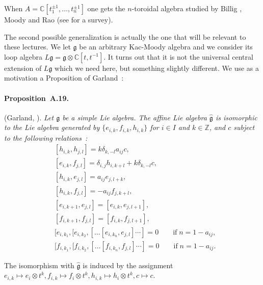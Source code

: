 \documentclass[a4paper,10pt]{amsart}
\def\Z{\mathbb{Z}}
\def\C{\mathbb{C}}
\def\g{\mathfrak{g}}
\numberwithin{equation}{section}
\begin{document}
{When $A=\C[t_1^{\pm 1}, \ldots, t_n^{\pm 1}]$ one gets the $n$-toroidal algebra studied by Billig \cite{Billig}, Moody \cite{MRY} and Rao \cite{Rao} (see \cite{Raosurvey} for a survey).

\vspace{.05in}

The second possible generalization is actually the one that will be relevant to these lectures. We let $\g$ be an arbitrary Kac-Moody algebra and we consider its loop algebra $L\g=\g \otimes \C[t,t^{-1}]$. It turns out that it is not the universal central extension of $L\g$ which we need here, but something slightly different. We use as a motivation a Proposition of Garland~:

\vspace{.1in}

\paragraph{\textbf{Proposition~A.19.}}(Garland, \cite{Garland}). \textit{Let $\g$ be a simple Lie algebra. The affine Lie algebra $\widehat{\g}$ is isomorphic to the Lie algebra generated by $\{e_{i,k},f_{i,k},h_{i,k}\}$ for $i \in I$ and $k \in \Z$, and $c$ subject to the following relations~:
\begin{equation}\label{E:defaffinelie}
\begin{split}
&[h_{i,k}, h_{j,l}]=k \delta_{k,-l}a_{ij}{c},\\
& [e_{i,k},f_{j,l}]=\delta_{i,j}h_{i,k+l}+ k \delta_{k,-l} {c},\\
&[h_{i,k}, e_{j,l}]=a_{ij}e_{j,l+k},\\
& [h_{i,k}, f_{j,l}]=-a_{ij}f_{j,k+l},\\
&[e_{i,k+1},e_{j,l}]=[e_{i,k},e_{j,l+1}],\\
&[f_{i,k+1},f_{j,l}]=[f_{i,k},f_{j,l+1}],\\
&[e_{i,k_1},[e_{i,k_2},[\ldots [e_{i,k_n},e_{j,l}]\cdots ]=0 \qquad
\mathrm{if\;} n=1-a_{ij},\\
&[f_{i,k_1},[f_{i,k_2},[\ldots [f_{i,k_n},f_{j,l}]\cdots ]=0 \qquad
\mathrm{if\;} n=1-a_{ij}.
\end{split}
\end{equation}}

\vspace{.1in}

The isomorphism with $\widehat{\g}$ is induced by the assignment $e_{i,k} \mapsto e_i \otimes t^k, f_{i,k} \mapsto f_i \otimes t^k, h_{i,k} \mapsto h_i\otimes t^k, c \mapsto c$.

}
\end{document}

